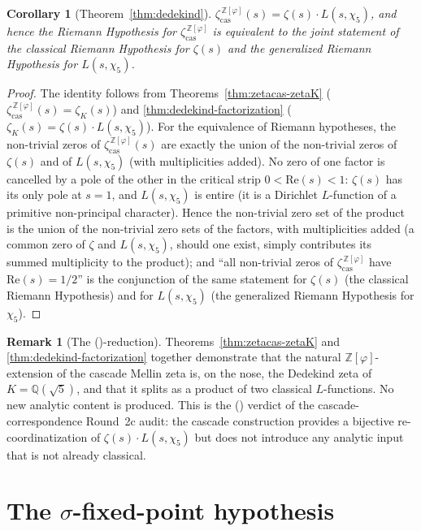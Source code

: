 \documentclass[11pt, a4paper]{amsart}
\newtheorem{corollary}[theorem]{Corollary}
\theoremstyle{definition}
\newtheorem{remark}[theorem]{Remark}
\newcommand{\Z}{\mathbb{Z}}
\newcommand{\Q}{\mathbb{Q}}
\newcommand{\pphi}{\varphi}
\newcommand{\zetacas}{\zeta_{\mathrm{cas}}}
\begin{document}
\begin{corollary}[Theorem~\ref{thm:dedekind}]\label{cor:dedekind}
$\zetacas^{\,\Z[\pphi]}(s) = \zeta(s) \cdot L(s, \chi_5)$, and
hence the Riemann Hypothesis for $\zetacas^{\,\Z[\pphi]}$ is
equivalent to the joint statement of the classical Riemann
Hypothesis for $\zeta(s)$ and the generalized Riemann Hypothesis
for $L(s, \chi_5)$.
\end{corollary}

\begin{proof}
The identity follows from
Theorems~\ref{thm:zetacas-zetaK}
($\zetacas^{\,\Z[\pphi]}(s) = \zeta_K(s)$) and
\ref{thm:dedekind-factorization}
($\zeta_K(s) = \zeta(s) \cdot L(s, \chi_5)$).  For
the equivalence of Riemann hypotheses, the non-trivial zeros of
$\zetacas^{\,\Z[\pphi]}(s)$ are exactly the union of the
non-trivial zeros of $\zeta(s)$ and of $L(s,\chi_5)$ (with
multiplicities added).  No zero of one factor is cancelled by a
pole of the other in the critical strip $0 < \mathrm{Re}(s) < 1$:
$\zeta(s)$ has its only pole at $s=1$, and $L(s,\chi_5)$ is entire
(it is a Dirichlet $L$-function of a primitive non-principal
character).  Hence the non-trivial zero set of the product is
the union of the non-trivial zero sets of the factors, with
multiplicities added (a common zero of $\zeta$ and $L(s,\chi_5)$,
should one exist, simply contributes its summed multiplicity to
the product); and ``all non-trivial zeros of
$\zetacas^{\,\Z[\pphi]}$ have
$\mathrm{Re}(s) = 1/2$'' is the conjunction of the same statement
for $\zeta(s)$ (the classical Riemann Hypothesis) and for
$L(s, \chi_5)$ (the generalized Riemann Hypothesis for $\chi_5$).
\end{proof}

\begin{remark}[The (\textdelta)-reduction]\label{rmk:zetacas-Zphi-delta}
Theorems~\ref{thm:zetacas-zetaK} and \ref{thm:dedekind-factorization}
together demonstrate that the natural $\Z[\pphi]$-extension of the
cascade Mellin zeta is, on the nose, the Dedekind zeta of
$K = \Q(\sqrt{5})$, and that it splits as a product of two
classical $L$-functions. No new analytic content is produced.
This is the (\textdelta) verdict of the cascade-correspondence
Round~2c audit: the cascade construction provides a bijective
re-coordinatization of $\zeta(s) \cdot L(s, \chi_5)$ but does not
introduce any analytic input that is not already classical.
\end{remark}

\section{The $\sigma$-fixed-point hypothesis}\label{sec:sigmafix}
\end{document}
